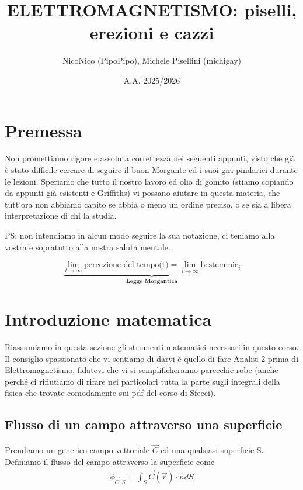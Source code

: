 \documentclass{book}
\title{ELETTROMAGNETISMO: piselli, erezioni e cazzi}
\author{NicoNico (PipoPipo), Michele Pisellini (michigay)}
\date{A.A. 2025/2026}
\begin{document}
\maketitle
\chapter*{Premessa}
     Non promettiamo rigore e assoluta correttezza nei seguenti appunti, visto che già è stato difficile cercare di seguire il buon Morgante ed i suoi giri pindarici durante le lezioni. Speriamo che tutto il nostro lavoro ed olio di gomito (stiamo copiando da appunti già esistenti e Griffiths) vi possano aiutare in questa materia, che tutt'ora non abbiamo capito se abbia o meno un ordine preciso, o se sia a libera interpretazione di chi la studia. 
    
    PS: non intendiamo in alcun modo seguire la sua notazione, ci teniamo alla vostra e sopratutto alla nostra saluta mentale. 


 

\[    
\underbrace{\lim_{t\to \infty} \text{percezione del tempo(t)} = \lim_{i\to \infty}\text{bestemmie}_i}_{\textbf{Legge Morgantica}} 
\]






\newpage
\tableofcontents

\newpage




\chapter{Introduzione matematica}
Riassumiamo in questa sezione gli strumenti matematici necessari in questo corso. Il consiglio spassionato che vi sentiamo di darvi è quello di fare Analisi 2 prima di Elettromagnetismo, fidatevi che vi si semplificheranno parecchie robe (anche perché ci rifiutiamo di rifare nei particolari tutta la parte sugli integrali della fisica che trovate comodamente sui pdf del corso di Sfecci).



\section{Flusso di un campo attraverso una superficie}
Prendiamo un generico campo vettoriale $\vec{C}$ ed una qualsiasi superficie S. Definiamo il flusso del campo attraverso la superficie come 
\begin{align*}
    \phi_{\vec{C}, S} = \int_S \vec{C}(\vec{r}) \cdot \hat{n} dS
\end{align*}
\end{document}
